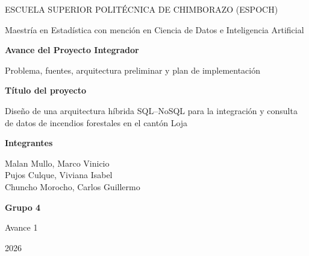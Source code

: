 \documentclass[11pt,a4paper]{article}
\begin{document}
\begin{titlepage}
\centering
\vspace*{1cm}

{\large ESCUELA SUPERIOR POLIT\'ECNICA DE CHIMBORAZO (ESPOCH)\par}
\vspace{0.3cm}
{\large Maestr\'ia en Estad\'istica con menci\'on en Ciencia de Datos e Inteligencia Artificial\par}

\vspace{2.5cm}
{\Huge\bfseries\color{myNewColorA} Avance del Proyecto Integrador\par}
\vspace{0.5cm}
{\large Problema, fuentes, arquitectura preliminar y plan de implementaci\'on\par}

\vspace{1.5cm}
\begin{minipage}{0.85\textwidth}
\centering
{\Large\bfseries T\'itulo del proyecto\par}
\vspace{0.3cm}
{\large Dise\~no de una arquitectura h\'ibrida SQL--NoSQL para la integraci\'on y consulta de datos de incendios forestales en el cant\'on Loja\par}
\end{minipage}

\vspace{2cm}
{\large\bfseries Integrantes\par}
\vspace{0.3cm}
{\large
Malan Mullo, Marco Vinicio \\
Pujos Culque, Viviana Isabel \\
Chuncho Morocho, Carlos Guillermo \par}

\vspace{2cm}
{\large\bfseries Grupo 4}\par

\vspace{1.5cm}
{\large Avance 1 \par}
{\large 2026 \par}

\vfill
\end{titlepage}

\end{document}
